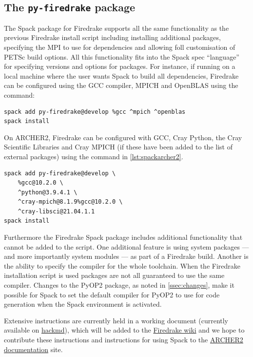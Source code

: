 \documentclass[a4paper,11pt]{article}
\begin{document}
\subsection{The \texttt{py-firedrake} package}
\label{ssec:py-firedrake}
The Spack package for Firedrake supports all the same functionality as the previous Firedrake install script including installing additional packages, specifying the MPI to use for dependencies and allowing foll customisation of PETSc build options.
All this functionality fits into the Spack spec ``language'' for specifying versions and options for packages.
For instance, if running on a local machine where the user wants Spack to build all dependencies, Firedrake can be configured using the GCC compiler, MPICH and OpenBLAS using the command:
\begin{lstlisting}
spack add py-firedrake@develop %gcc ^mpich ^openblas
spack install
\end{lstlisting}

On ARCHER2, Firedrake can be configured with GCC, Cray Python, the Cray Scientific Libraries and Cray MPICH (if these have been added to the list of external packages) using the command in \cref{lst:spackarcher2}.
\begin{lstlisting}[float,caption={Spack configuration for ARCHER2 using GCC, Cray Python, Cray MPICH and Cray scientific libraries},label={lst:spackarcher2}]
spack add py-firedrake@develop \
    %gcc@10.2.0 \
    ^python@3.9.4.1 \
    ^cray-mpich@8.1.9%gcc@10.2.0 \
    ^cray-libsci@21.04.1.1
spack install
\end{lstlisting}
Furthermore the Firedrake Spack package includes additional functionality that cannot be added to the script.
One additional feature is using system packages --- and more importantly system modules --- as part of a Firedrake build.
Another is the ability to specify the compiler for the whole toolchain.
When the Firedrake installation script is used packages are not all guaranteed to use the same compiler.
Changes to the PyOP2 package, as noted in \cref{ssec:changes}, make it possible for Spack to set the default compiler for PyOP2 to use for code generation when the Spack environment is activated.

Extensive instructions are currently held in a working document (currently available on \href{https://hackmd.io/Sg3fYXuCTl61d_LAg4QnMw}{hackmd}), which will be added to the \href{https://github.com/firedrakeproject/firedrake/wiki}{Firedrake wiki}\cite{firedrakewiki} and we hope to contribute these instructions and instructions for using Spack to the \href{https://docs.archer2.ac.uk/}{ARCHER2 documentation}\cite{archer2docs} site.
\end{document}
